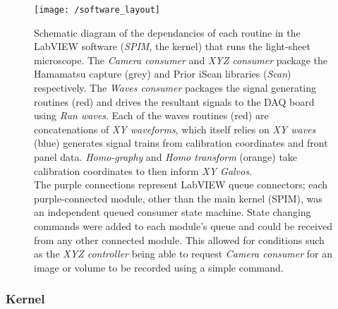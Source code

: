 
\begin{figure}
    \centering
    \texttt{[image: /software\_layout]}
    \caption{Schematic diagram of the dependancies of each routine in the \gls{LabVIEW} software (\emph{SPIM}, the kernel) that runs the light-sheet microscope.
    The \emph{Camera consumer} and \emph{XYZ consumer} package the Hamamatsu capture (grey) and Prior iScan libraries (\emph{Scan}) respectively.
    The \emph{Waves consumer} packages the signal generating routines (red) and drives the resultant signals to the DAQ board using \emph{Run waves}.
    Each of the waves routines (red) are concatenations of \emph{XY waveforms}, which itself relies on \emph{XY waves} (blue) generates signal trains from calibration coordinates and front panel data.
    \emph{Homo-graphy} and \emph{Homo transform} (orange) take calibration coordinates to then inform \emph{XY Galvos}.\\
    The purple connections represent \gls{LabVIEW} queue connectors; each purple-connected module, other than the main kernel (SPIM), was an independent queued consumer state machine.
    State changing commands were added to each module's queue and could be received from any other connected module.
    This allowed for conditions such as the \emph{XYZ controller} being able to request \emph{Camera consumer} for an image or volume to be recorded using a simple  command.
    }\label{fig:software_layout}
\end{figure}

\subsubsection{Kernel}


